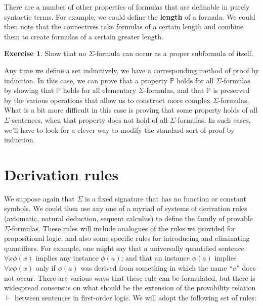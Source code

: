 \documentclass[11pt,fleqn]{article}
\theoremstyle{definition}
\newtheorem{exercise}[prop]{Exercise}
\theoremstyle{remark}
\newcommand{\2}{\mathscr}
\newcounter{axi}\setcounter{axi}{0}
\begin{document}
There are a number of other properties of formulas that are definable
in purely syntactic terms.  For example, we could define the
\textbf{length} of a formula.  We could then note that the connectives
take formulas of a certain length and combine them to create formulas
of a certain greater length.

\begin{exercise} Show that no $\Sigma$-formula can occur as a proper
  subformula of itself. \end{exercise}




Any time we define a set inductively, we have a corresponding method
of proof by induction.  In this case, we can prove that a property
$\mathbb{P}$ holds for all $\Sigma$-formulas by showing that
$\mathbb{P}$ holds for all elementary $\Sigma$-formulas, and that
$\mathbb{P}$ is preserved by the various operations that allow us to
construct more complex $\Sigma$-formulas.  What is a bit more
difficult in this case is proving that some property holds of all
$\Sigma$-sentences, when that property does not hold of all
$\Sigma$-formulas.  In such cases, we'll have to look for a clever way
to modify the standard sort of proof by induction.







\section*{Derivation rules}

We suppose again that $\Sigma$ is a fixed signature that has no
function or constant symbols.  We could then use any one of a myriad
of systems of derivation rules (axiomatic, natural deduction, sequent
calculus) to define the family of provable $\Sigma$-formulas.  These
rules will include analogues of the rules we provided for
propositional logic, and also some specific rules for introducing and
eliminating quantifiers.  For example, one might say that a
universally quantified sentence $\forall x\phi (x)$ implies any
instance $\phi (a)$; and that an instance $\phi (a)$ implies
$\forall x\phi (x)$ only if $\phi (a)$ was derived from something in
which the name ``$a$'' does not occur.  There are various ways that
these rule can be formulated, but there is widespread consensus on
what should be the extension of the provability relation $\vdash$
between sentences in first-order logic.  We will adopt the following
set of rules:
\end{document}
